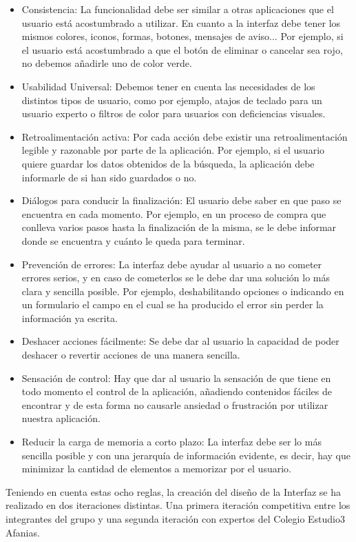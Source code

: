 \begin{itemize} 
	\item Consistencia: La funcionalidad debe ser similar a otras aplicaciones que el usuario está acostumbrado a utilizar. En cuanto a la interfaz debe tener los mismos colores, iconos, formas, botones, mensajes de aviso... Por ejemplo, si el usuario está acostumbrado a que el botón de eliminar o cancelar sea rojo, no debemos añadirle uno de color verde.
	\item Usabilidad Universal: Debemos tener en cuenta las necesidades de los distintos tipos de usuario, como por ejemplo, atajos de teclado para un usuario experto o filtros de color para usuarios con deficiencias visuales.
	\item Retroalimentación activa: Por cada acción debe existir una retroalimentación legible y razonable por parte de la aplicación. Por ejemplo, si el usuario quiere guardar los datos obtenidos de la búsqueda, la aplicación debe informarle de si han sido guardados o no.
	\item Diálogos para conducir la finalización: El usuario debe saber en que paso se encuentra en cada momento. Por ejemplo, en un proceso de compra que conlleva varios pasos hasta la finalización de la misma, se le debe informar donde se encuentra y cuánto le queda para terminar.
	\item Prevención de errores: La interfaz debe ayudar al usuario a no cometer errores serios, y en caso de cometerlos se le debe dar una solución lo más clara y sencilla posible. Por ejemplo, deshabilitando opciones o indicando en un formulario el campo en el cual se ha producido el error sin perder la información ya escrita.
	\item Deshacer acciones fácilmente: Se debe dar al usuario la capacidad de poder deshacer o revertir acciones de una manera sencilla. 
	\item Sensación de control: Hay que dar al usuario la sensación de que tiene en todo momento el control de la aplicación, añadiendo contenidos fáciles de encontrar y de esta forma no causarle ansiedad o frustración por utilizar nuestra aplicación.
	\item Reducir la carga de memoria a corto plazo: La interfaz debe ser lo más sencilla posible y con una jerarquía de información evidente, es decir, hay que minimizar la cantidad de elementos a memorizar por el usuario.
\end{itemize}
Teniendo en cuenta estas ocho reglas, la creación del diseño de la Interfaz se ha realizado en dos iteraciones distintas. Una primera iteración competitiva entre los integrantes del grupo y una segunda iteración con expertos del Colegio Estudio3 Afanias. 

